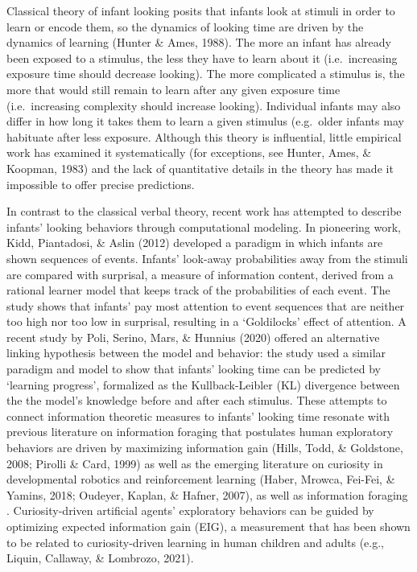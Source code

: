 \documentclass[10pt, letterpaper]{article}
\begin{document}
Classical theory of infant looking posits that infants look at stimuli
in order to learn or encode them, so the dynamics of looking time are
driven by the dynamics of learning (Hunter \& Ames, 1988). The more an
infant has already been exposed to a stimulus, the less they have to
learn about it (i.e.~increasing exposure time should decrease looking).
The more complicated a stimulus is, the more that would still remain to
learn after any given exposure time (i.e.~increasing complexity should
increase looking). Individual infants may also differ in how long it
takes them to learn a given stimulus (e.g.~older infants may habituate
after less exposure. Although this theory is influential, little
empirical work has examined it systematically (for exceptions, see
Hunter, Ames, \& Koopman, 1983) and the lack of quantitative details in
the theory has made it impossible to offer precise predictions.

In contrast to the classical verbal theory, recent work has attempted to
describe infants' looking behaviors through computational modeling. In
pioneering work, Kidd, Piantadosi, \& Aslin (2012) developed a paradigm
in which infants are shown sequences of events. Infants' look-away
probabilities away from the stimuli are compared with surprisal, a
measure of information content, derived from a rational learner model
that keeps track of the probabilities of each event. The study shows
that infants' pay most attention to event sequences that are neither too
high nor too low in surprisal, resulting in a `Goldilocks' effect of
attention. A recent study by Poli, Serino, Mars, \& Hunnius (2020)
offered an alternative linking hypothesis between the model and
behavior: the study used a similar paradigm and model to show that
infants' looking time can be predicted by `learning progress',
formalized as the Kullback-Leibler (KL) divergence between the the
model's knowledge before and after each stimulus. These attempts to
connect information theoretic measures to infants' looking time resonate
with previous literature on information foraging that postulates human
exploratory behaviors are driven by maximizing information gain (Hills,
Todd, \& Goldstone, 2008; Pirolli \& Card, 1999) as well as the emerging
literature on curiosity in developmental robotics and reinforcement
learning (Haber, Mrowca, Fei-Fei, \& Yamins, 2018; Oudeyer, Kaplan, \&
Hafner, 2007), as well as information foraging . Curiosity-driven
artificial agents' exploratory behaviors can be guided by optimizing
expected information gain (EIG), a measurement that has been shown to be
related to curiosity-driven learning in human children and adults (e.g.,
Liquin, Callaway, \& Lombrozo, 2021).
\end{document}
